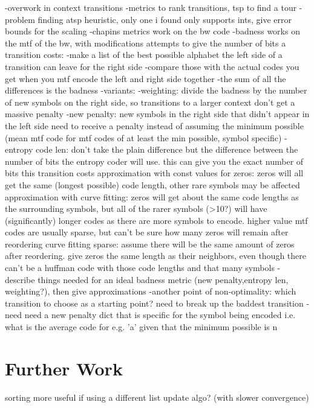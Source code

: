 \documentclass[a4paper]{scrreprt}
\begin{document}
-overwork in context transitions
-metrics to rank transitions, tsp to find a tour
-problem finding atsp heuristic, only one i found only supports ints, give 
	error bounds for the scaling
-chapins metrics work on the bw code
-badness works on the mtf of the bw, with modifications attempts to give the
	number of bits a transition costs:
	-make a list of the best possible alphabet the left side of a transition
		can leave for the right side
	-compare those with the actual codes you get when you mtf encode the left
		and right side together
	-the sum of all the differences is the badness
	-variants:
		-weighting: divide the badness by the number of new symbols on the right
			side, so transitions to a larger context don't get a massive
			penalty
		-new penalty: new symbols in the right side that didn't appear in the
			left side need to receive a penalty instead of assuming the minimum
			possible (mean mtf code for mtf codes of at least the min possible,
			symbol specific)
		-entropy code len: don't take the plain difference but the difference
			between the number of bits the entropy coder will use. this can
			give you the exact number of bits this transition costs
			approximation with const values for zeros: zeros will all get the
			same (longest possible) code length, other rare symbols may be
			affected
			approximation with curve fitting: zeros will get about the same
			code lengths as the surrounding symbols, but all of the rarer
			symbols (>10?) will have (significantly) longer codes as there are
			more symbols to encode. higher value mtf codes are usually sparse,
			but can't be sure how many zeros will remain after reordering
			curve fitting sparse: assume there will be the same amount of
			zeros after reordering. give zeros the same length as their
			neighbors, even though there can't be a huffman code with those
			code lengths and that many symbols 
	-describe things needed for an ideal badness metric (new penalty,entropy
		len, weighting?), then give approximations
	-another point of non-optimality: which transition to choose as a starting
		point? need to break up the baddest transition
	-need need a new penalty dict that is specific for the symbol being encoded
		i.e. what is the average code for e.g. 'a' given that the minimum
		possible is n


\section{Further Work}

sorting more useful if using a different list update algo? (with slower
convergence)
\end{document}
